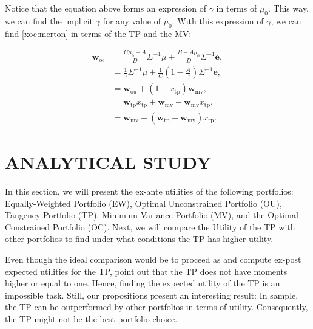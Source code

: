 \documentclass[12pt,oneside,a4paper]{memoir}
\begin{document}
\noindent
Notice that the equation above forms an expression of $\gamma$ in terms of $\mu_0$.
This way, we can find the implicit $\gamma$ for any value of $\mu_0$.
With this expression of $\gamma$, we can find \eqref{xoc:merton} in terms of the TP and the MV:

\vspace{-2 em}
\begin{align*}
\mathbf{w}_{\mathrm{oc}} &= \frac{C \mu_0 - A}{D}\Sigma^{-1} \mu + \frac{B - A \mu_0}{D}\Sigma^{-1} \mathbf{e},
\\
&= \frac{1}{\gamma}\Sigma^{-1} \mu +
\frac{1}{C} \left( 1 - \frac{A}{\gamma} \right) \Sigma^{-1} \mathbf{e},
\\
&= \mathbf{w}_{\textrm{ou}} + (1 - x_{\textrm{tp}} )\mathbf{w}_{\textrm{mv}},
\\
&= \mathbf{w}_{\textrm{tp}}   x_{\textrm{tp}}+ \mathbf{w}_{\textrm{mv}} -\mathbf{w}_{\textrm{mv}}   x_{\textrm{tp}},
\\
&= \mathbf{w}_{\textrm{mv}} + (\mathbf{w}_{\textrm{tp}}-\mathbf{w}_{\textrm{mv}} )  x_{\textrm{tp}}.
\end{align*}


\section{ANALYTICAL STUDY} \label{sec:critique}

In this section, we will present the ex-ante utilities of the following portfolios: Equally-Weighted Portfolio (EW), Optimal Unconstrained Portfolio (OU), Tangency Portfolio (TP), Minimum Variance Portfolio (MV), and the Optimal Constrained Portfolio (OC).
Next, we will compare the Utility of the TP with other portfolios to find under what conditions the TP has higher utility.

Even though the ideal comparison would be to proceed as  and compute ex-post expected utilities for the TP,  point out that the TP does not have moments higher or equal to one. Hence, finding the expected utility of the TP is an impossible task. Still, our propositions present an interesting result: In sample, the TP can be outperformed by other portfolios in terms of utility. Consequently, the TP might not be the best portfolio choice. %
\end{document}
